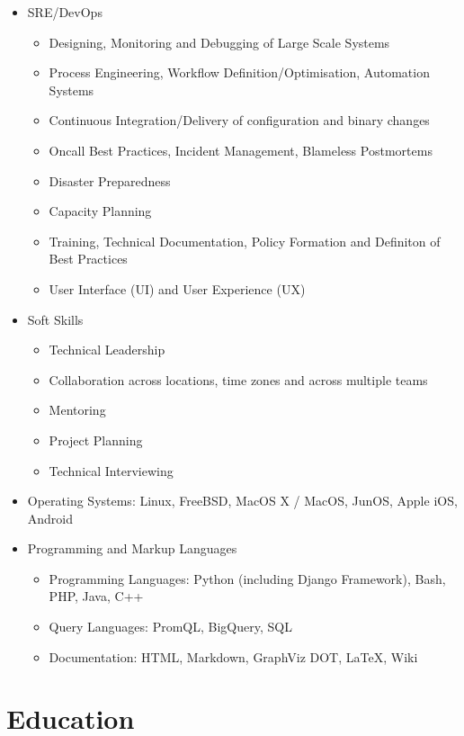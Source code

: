 \documentclass[a4paper, 10pt] {article}
\begin{document}
\begin{itemize}[itemsep=2pt,parsep=2pt]
\item SRE/DevOps
  \begin{itemize}[itemsep=2pt,parsep=2pt]
  \item Designing, Monitoring and Debugging of Large Scale Systems
  \item Process Engineering, Workflow Definition/Optimisation, Automation Systems
  \item Continuous Integration/Delivery of configuration and binary changes
  \item Oncall Best Practices, Incident Management, Blameless Postmortems
  \item Disaster Preparedness
  \item Capacity Planning
  \item Training, Technical Documentation, Policy Formation and Definiton of Best Practices
  \item User Interface (UI) and User Experience (UX)
  \end{itemize}
\item Soft Skills
  \begin{itemize}[itemsep=2pt,parsep=2pt]
  \item Technical Leadership
  \item Collaboration across locations, time zones and across multiple teams
  \item Mentoring
  \item Project Planning
  \item Technical Interviewing
  \end{itemize}
  \item Operating Systems: Linux, FreeBSD, MacOS X / MacOS, JunOS, Apple iOS, Android
\item Programming and Markup Languages
  \begin{itemize}[itemsep=2pt,parsep=2pt]
  \item Programming Languages: Python (including Django Framework), Bash, PHP, Java, C++
  \item Query Languages: PromQL, BigQuery, SQL
  \item Documentation: HTML, Markdown, GraphViz DOT, \LaTeX, Wiki
  \end{itemize}
\end{itemize}  

\hrulefill

\section*{Education}
\end{document}
